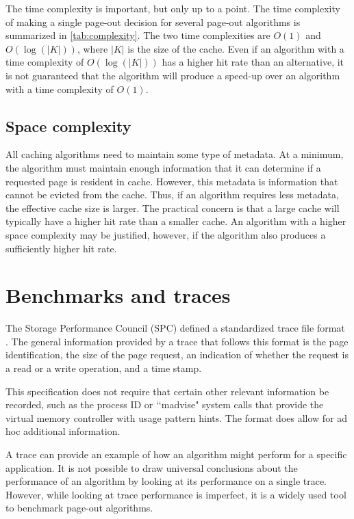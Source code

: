  The time complexity is important, but only up to a point. The time complexity
  of making a single page-out decision for several page-out algorithms is
  summarized in \ref{tab:complexity}. The two time complexities are $O(1)$ and
  $O(\log(|K|))$, where $|K|$ is the size of the cache. Even if an algorithm
  with a time complexity of $O(\log(|K|))$ has a higher hit rate than an
  alternative, it is not guaranteed that the algorithm will produce a speed-up
  over an algorithm with a time complexity of $O(1)$.

\subsection{Space complexity}
  All caching algorithms need to maintain some type of metadata. At a minimum,
  the algorithm must maintain enough information that it can determine if a
  requested page is resident in cache. However, this metadata is information
  that cannot be evicted from the cache. Thus, if an algorithm requires less
  metadata, the effective cache size is larger. The practical concern is that
  a large cache will typically have a higher hit rate than a smaller cache. An
  algorithm with a higher space complexity may be justified, however, if the
  algorithm also produces a sufficiently higher hit rate.

\section{Benchmarks and traces}
  The Storage Performance Council (SPC) defined a standardized trace file
  format \cite{SPC1}. The general information provided by a trace that follows
  this format is the page identification, the size of the page request, an
  indication of whether the request is a read or a write operation, and a
  time stamp.

  This specification does not require that certain other relevant information be
  recorded, such as the process ID or \lq\lq madvise" system calls that provide
  the virtual memory controller with usage pattern hints. The format does allow
  for ad hoc additional information.

  A trace can provide an example of how an algorithm might perform for a
  specific application. It is not possible to draw universal conclusions about
  the performance of an algorithm by looking at its performance on a single trace.
  However, while looking at trace performance is imperfect, it is a widely used
  tool to benchmark page-out algorithms.

